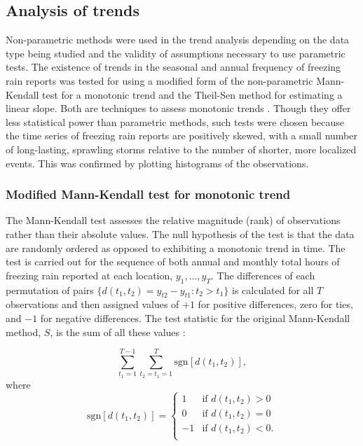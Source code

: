 \documentclass[twocol]{ametsoc}
\begin{document}
\subsection{Analysis of trends}
Non-parametric methods were used in the trend analysis depending on the data type being studied and the validity of assumptions necessary to use parametric tests. The existence of trends in the seasonal and annual frequency of freezing rain reports was tested for using a modified form of the non-parametric Mann-Kendall test for a monotonic trend and the Theil-Sen method for estimating a linear slope. Both are techniques to assess monotonic trends \citep{chandler2011statistical}. Though they offer less statistical power than parametric methods, such tests were chosen because the time series of freezing rain reports are positively skewed, with a small number of long-lasting, sprawling storms relative to the number of shorter, more localized events. This was confirmed by plotting histograms of the observations.

\subsubsection{Modified Mann-Kendall test for monotonic trend}
The Mann-Kendall test assesses the relative magnitude (rank) of observations rather than their absolute values. The null hypothesis of the test is that the data are randomly ordered as opposed to exhibiting a monotonic trend in time. The test is carried out for the sequence of both annual and monthly total hours of freezing rain reported at each location, $y_1,\ldots,y_T$. The differences of each permutation of pairs $\{d(t_1,t_2)=y_{t2}-y_{t1}:t_2>t_1\}$ is calculated for all $T$ observations and then assigned values of $+1$ for positive differences, zero for ties, and $-1$ for negative differences. The test statistic for the original Mann-Kendall method, $S$, is the sum of all these values :

\[\sum_{t_1=1}^{T-1}\sum_{t_2=t_1=1}^T\text{sgn}[d(t_1,t_2)],\] where\\

\[\text{sgn}[d(t_1,t_2)]=\begin{cases} 1 & \text{if } d(t_1,t_2)>0\\ 0 & \text{if } d(t_1,t_2)=0\\ -1 & \text{if } d(t_1,t_2)<0.\\ \end{cases}\]
\end{document}
